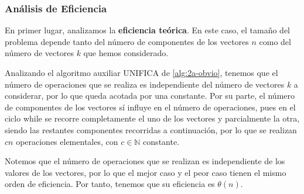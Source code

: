 

\subsubsection{Análisis de Eficiencia}

En primer lugar, analizamos la \textbf{eficiencia teórica}. En este caso,
el tamaño del problema depende tanto del número de componentes
de los vectores $n$ como del número de vectores $k$ que hemos
considerado. 

Analizando el algoritmo auxiliar UNIFICA de \ref{alg:2a-obvio}, tenemos que el 
número de operaciones que se realiza es independiente
del número de vectores $k$ a considerar, por lo que queda
acotada por una constante. Por su parte, el número de componentes de los
vectores sí influye en el número de operaciones, pues en el ciclo while se recorre completamente
el uno de los vectores y parcialmente la otra, siendo las restantes componentes recorridas
a continuación, por lo que se realizan $cn$ operaciones elementales,
con $c \in \mathbb N$ constante. 

Notemos que el número de operaciones que
se realizan es independiente de los valores de los vectores,
por lo que el mejor caso y el peor caso tienen el mismo orden
de eficiencia. Por tanto, tenemos que su eficiencia es $\theta(n)$. 

